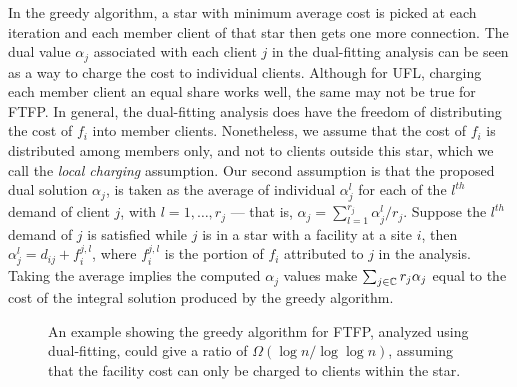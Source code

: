 \documentclass[oneside,final]{ucr}
\def\dsp{\def\baselinestretch{2.0}\large\normalsize}
\def\ssp{\def\baselinestretch{1.0}\large\normalsize}
\begin{document}
In the greedy algorithm, a star with minimum average cost is
picked at each iteration and each member client of that star
then gets one more connection. The dual value $\alpha_j$
associated with each client $j$ in the dual-fitting analysis
can be seen as a way to charge the cost to individual
clients. Although for UFL, charging each member client an
equal share works well, the same may not be true for
FTFP. In general, the dual-fitting analysis does have the
freedom of distributing the cost of $f_i$ into member
clients. Nonetheless, we assume that the cost of $f_i$ is
distributed among members only, and not to clients outside
this star, which we call the \emph{local charging}
assumption. Our second assumption is that the proposed dual
solution $\alpha_j$, is taken as the average of individual
$\alpha_j^l$ for each of the $l^{th}$ demand of client $j$,
with $l=1,\ldots,r_j$ --- that is, $\alpha_j =
\sum_{l=1}^{r_j} \alpha_j^l / r_j$. Suppose the $l^{th}$
demand of $j$ is satisfied while $j$ is in a star with a
facility at a site $i$, then $\alpha_j^l = d_{ij} +
f_i^{j,l}$, where $f_i^{j,l}$ is the portion of $f_i$
attributed to $j$ in the analysis. Taking the average
implies the computed $\alpha_j$ values make
$\sum_{j\in\mathbb{C}} r_j \alpha_j$ equal to the cost of
the integral solution produced by the greedy algorithm.

\begin{figure}
  \centering
  \ssp
  \caption[The $\Omega(\log n / \log\log n)$ example for
  dual-fitting for {\FTFP}]{An example showing the greedy
    algorithm for FTFP, analyzed using dual-fitting, could
    give a ratio of $\Omega(\log n / \log\log n)$, assuming
    that the facility cost can only be charged to clients
    within the star.}
  \dsp
  \label{fig:greedy_lower_bound}
\end{figure}
\end{document}

